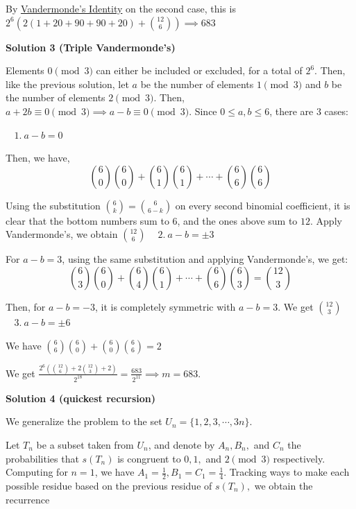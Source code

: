 \begin{enumerate}
 By \href{https://artofproblemsolving.com/wiki/index.php?title=Combinatorial\_identity}{ Vandermonde's Identity} on the second case, this is $2^6 \left( 2\left(1+20+90+90+20\right) + \binom{12}{6} \right)\implies \boxed{683}$




\textbf{Solution 3 (Triple Vandermonde's)}

Elements $0 \pmod{3}$ can either be included or excluded, for a total of $2^6$. Then, like the previous solution, let $a$ be the number of elements $1 \pmod{3}$ and $b$ be the number of elements $2 \pmod{3}$. Then, $a + 2b \equiv 0 \pmod{3} \implies a - b \equiv 0 \pmod{3}$. Since $0 \le a, b \le 6$, there are 3 cases:

 $\>\>\>\> 1. \> a - b = 0$

 Then, we have,
 \[\binom{6}{0}\binom{6}{0} + \binom{6}{1}\binom{6}{1} + \cdots + \binom{6}{6} \binom{6}{6}\]

 Using the substitution $\binom{6}{k} = \binom{6}{6-k}$ on every second binomial coefficient, it is clear that the bottom numbers sum to $6$, and the ones above sum to $12$. Apply Vandermonde's, we obtain $\binom{12}{6}$
$\>\>\>\> 2. \> a - b = \pm 3$

 For $a - b = 3$, using the same substitution and applying Vandermonde's, we get:
 \[\binom{6}{3} \binom{6}{0} + \binom{6}{4} \binom{6}{1} + \cdots + \binom{6}{6} \binom{6}{3} = \binom{12}{3}\]

 Then, for $a - b = -3$, it is completely symmetric with $a - b = 3$. We get $\binom{12}{3}$
$\>\>\>\> 3. \> a - b = \pm 6$

 We have $\binom{6}{6} \binom{6}{0} + \binom{6}{0} \binom{6}{6} = 2$

 We get $\frac{2^6 (\binom{12}{6} + 2 \binom{12}{3} + 2)}{2^{18}} = \frac{683}{2^{11}} \implies m = \boxed{683}$.

 



\textbf{Solution 4 (quickest recursion)}

We generalize the problem to the set $U_n = \{1, 2, 3, \cdots{}, 3n\}.$ 

 Let $T_n$ be a subset taken from $U_n$, and denote by $A_n, B_n,$ and $C_n$ the probabilities that $s(T_n)$ is congruent to $0, 1,$ and $2 \pmod{3}$ respectively. Computing for $n=1$, we have $A_1 = \frac{1}{2}, B_1 = C_1 = \frac{1}{4}.$ Tracking ways to make each possible residue based on the previous residue of $s(T_n),$ we obtain the recurrence


\end{enumerate}
